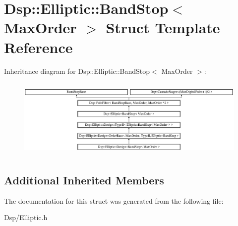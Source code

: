 \hypertarget{structDsp_1_1Elliptic_1_1BandStop}{\section{Dsp\-:\-:Elliptic\-:\-:Band\-Stop$<$ Max\-Order $>$ Struct Template Reference}
\label{structDsp_1_1Elliptic_1_1BandStop}
}
Inheritance diagram for Dsp\-:\-:Elliptic\-:\-:Band\-Stop$<$ Max\-Order $>$\-:\begin{figure}[H]
\begin{center}
\leavevmode
\includegraphics[height=3.916084cm]{structDsp_1_1Elliptic_1_1BandStop}
\end{center}
\end{figure}
\subsection*{Additional Inherited Members}


The documentation for this struct was generated from the following file\-:\begin{DoxyCompactItemize}
\item 
Dsp/Elliptic.\-h\end{DoxyCompactItemize}
